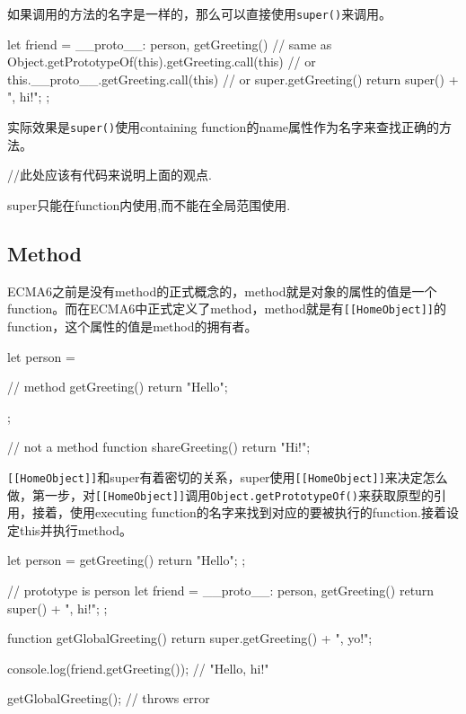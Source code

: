 如果调用的方法的名字是一样的，那么可以直接使用\lstinline$super()$来调用。

\begin{JavaScript}
let friend = {
    __proto__: person,
    getGreeting() {
        // same as Object.getPrototypeOf(this).getGreeting.call(this)
        // or this.__proto__.getGreeting.call(this)
        // or super.getGreeting()
        return super() + ", hi!";
    }
};
\end{JavaScript}

实际效果是\lstinline$super()$使用containing function的name属性作为名字来查找正确的方法。

\begin{JavaScript}
//此处应该有代码来说明上面的观点.
\end{JavaScript}

super只能在function内使用,而不能在全局范围使用.


\subsection{Method}

ECMA6之前是没有method的正式概念的，method就是对象的属性的值是一个function。而在ECMA6中正式定义了method，method就是有\lstinline$[[HomeObject]]$的function，这个属性的值是method的拥有者。

\begin{JavaScript}
let person = {

    // method
    getGreeting() {
        return "Hello";
    }
};

// not a method
function shareGreeting() {
    return "Hi!";
}
\end{JavaScript}

\lstinline$[[HomeObject]]$和super有着密切的关系，super使用\lstinline$[[HomeObject]]$来决定怎么做，第一步，对\lstinline$[[HomeObject]]$调用\lstinline$Object.getPrototypeOf()$来获取原型的引用，接着，使用executing function的名字来找到对应的要被执行的function.接着设定this并执行method。

\begin{JavaScript}
let person = {
    getGreeting() {
        return "Hello";
    }
};

// prototype is person
let friend = {
    __proto__: person,
    getGreeting() {
        return super() + ", hi!";
    }
};

function getGlobalGreeting() {
    return super.getGreeting() + ", yo!";
}

console.log(friend.getGreeting());  // "Hello, hi!"

getGlobalGreeting();                      // throws error
\end{JavaScript}

